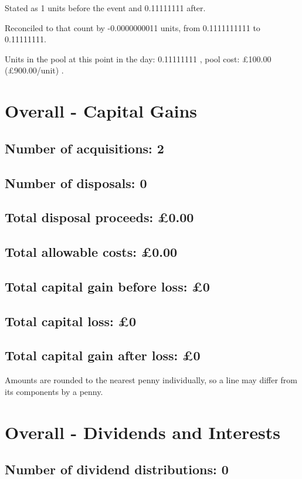 \documentclass{article}
\begin{document}
Stated as 1 units before the event and 0.11111111 after.

Reconciled to that count by -0.0000000011 units, from 0.1111111111 to 0.11111111.

Units in the pool at this point in the day: 0.11111111%
,
    pool cost: £100.00
    (£900.00/unit)%
.





\clearpage
\section*{Overall - Capital Gains}
\subsection*{Number of acquisitions: 2}
\subsection*{Number of disposals: 0}
\subsection*{Total disposal proceeds: £0.00}
\subsection*{Total allowable costs: £0.00}
\subsection*{Total capital gain before loss: £0}
\subsection*{Total capital loss: £0}
\subsection*{Total capital gain after loss: £0}
\vspace{1em}
Amounts are rounded to the nearest penny individually, so a line may differ from its components by a penny.
\vspace{2em}
\section*{Overall - Dividends and Interests}
\subsection*{Number of dividend distributions: 0}
\end{document}
